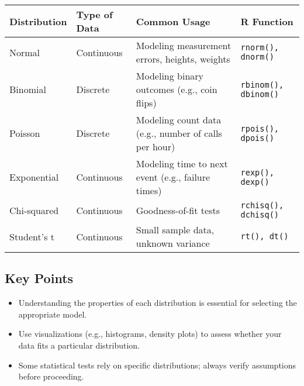 \begin{tabularx}{\textwidth}{|l|X|X|X|}
\hline
\textbf{Distribution} & \textbf{Type of Data} & \textbf{Common Usage} & \textbf{R Function} \\
\hline
Normal & Continuous & Modeling measurement errors, heights, weights & \texttt{rnorm(), dnorm()} \\
\hline
Binomial & Discrete & Modeling binary outcomes (e.g., coin flips) & \texttt{rbinom(), dbinom()} \\
\hline
Poisson & Discrete & Modeling count data (e.g., number of calls per hour) & \texttt{rpois(), dpois()} \\
\hline
Exponential & Continuous & Modeling time to next event (e.g., failure times) & \texttt{rexp(), dexp()} \\
\hline
Chi-squared & Continuous & Goodness-of-fit tests & \texttt{rchisq(), dchisq()} \\
\hline
Student's t & Continuous & Small sample data, unknown variance & \texttt{rt(), dt()} \\
\hline
\end{tabularx}

\subsection{Key Points}
\begin{itemize}
    \item Understanding the properties of each distribution is essential for selecting the appropriate model.
    \item Use visualizations (e.g., histograms, density plots) to assess whether your data fits a particular distribution.
    \item Some statistical tests rely on specific distributions; always verify assumptions before proceeding.
\end{itemize}
